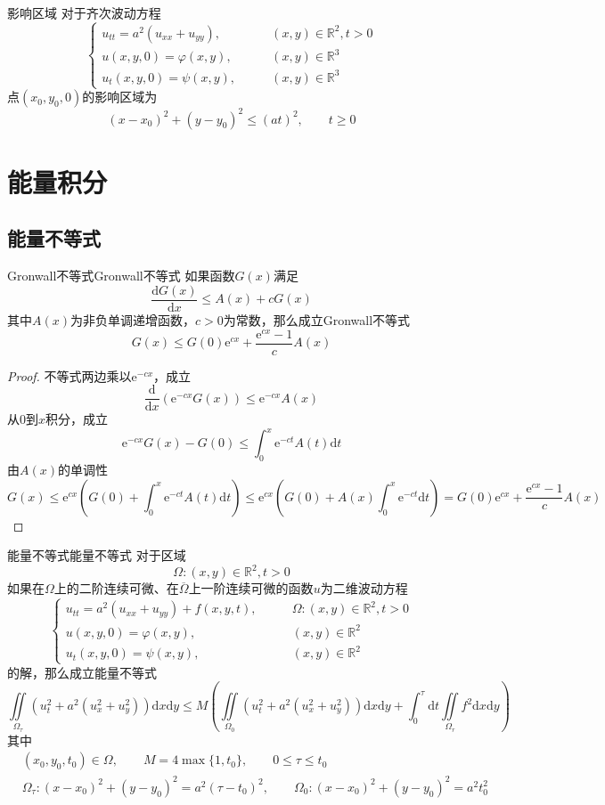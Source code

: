 \documentclass[lang = cn, scheme = chinese, thmcnt = section]{elegantbook}
\newcommand{\R}{\mathbb{R}}            %
\newcommand{\dd}{\mathrm{d}}           %
\newcommand{\ee}[1]{\mathrm{e}^{#1}}   %
\newcommand{\IInt}{\iint\limits}
\begin{document}
\begin{definition}{影响区域}
	对于齐次波动方程
	$$
	\begin{cases}
		u_{tt}=a^2(u_{xx}+u_{yy}),\qquad & (x,y)\in \R^2,t>0\\
		u(x,y,0)=\varphi(x,y),\qquad & (x,y)\in \R^3\\
		u_t(x,y,0)=\psi(x,y),\qquad & (x,y)\in \R^3
	\end{cases}
	$$
	点$(x_0,y_0,0)$的影响区域为
	$$
	(x-x_0)^2+(y-y_0)^2\le (at)^2,\qquad t\ge 0
	$$
\end{definition}

\section{能量积分}

\subsection{能量不等式}

\begin{lemma}{Gronwall不等式}{Gronwall不等式}
	如果函数$G(x)$满足%
	$$
	\frac{\dd G(x)}{\dd x}\le A(x)+cG(x)
	$$
	其中$A(x)$为非负单调递增函数，$c>0$为常数，那么成立Gronwall不等式%
	$$
	G(x)\le G(0)\ee{cx}+\frac{\ee{cx}-1}{c}A(x)
	$$
\end{lemma}

\begin{proof}
	不等式两边乘以$\ee{-cx}$，成立%
	$$
	\frac{\dd}{\dd x}\left(\ee{-cx}G(x)\right)\le\ee{-cx}A(x)
	$$
	从$0$到$x$积分，成立%
	$$
	\ee{-cx}G(x)-G(0)\le \int_{0}^{x}\ee{-ct}A(t)\dd t
	$$
	由$A(x)$的单调性%
	$$
	G(x)
	\le \ee{cx}\left(G(0)+\int_{0}^{x}\ee{-ct}A(t)\dd t\right)
	\le \ee{cx}\left(G(0)+A(x)\int_{0}^{x}\ee{-ct}\dd t\right)
	= G(0)\ee{cx}+\frac{\ee{cx}-1}{c}A(x)
	$$
\end{proof}

\begin{lemma}{能量不等式}{能量不等式}
	对于区域%
	$$
	\Omega:(x,y)\in \R^2,t>0
	$$
	如果在$\Omega$上的二阶连续可微、在$\overline{\Omega}$上一阶连续可微的函数$u$为二维波动方程
	$$
	\begin{cases}
		u_{tt}=a^2(u_{xx}+u_{yy})+f(x,y,t),\qquad & \Omega:(x,y)\in \R^2,t>0\\
		u(x,y,0)=\varphi(x,y),\qquad & (x,y)\in \R^2\\
		u_t(x,y,0)=\psi(x,y),\qquad & (x,y)\in \R^2
	\end{cases}
	$$
	的解，那么成立能量不等式%
	$$
	\IInt_{\Omega_\tau}\left(u_{t}^2+a^2\left(u_x^2+u_y^2\right)\right)\dd x\dd y
	\le
	M\left( 
	\IInt_{\Omega_0}\left(u_{t}^2+a^2\left(u_x^2+u_y^2\right)\right)\dd x\dd y+\int_{0}^{\tau}\dd t\IInt_{\Omega_r}f^2\dd x\dd y
	 \right)
	$$
	其中
	\begin{align*}
		& (x_0,y_0,t_0)\in\Omega,\qquad 
		M=4\max\{ 1,t_0 \},\qquad
		0\le \tau \le t_0\\
		& \Omega_\tau:(x-x_0)^2+(y-y_0)^2= a^2(\tau-t_0)^2,\qquad
		\Omega_0:(x-x_0)^2+(y-y_0)^2= a^2t_0^2
	\end{align*}
\end{lemma}
\end{document}
